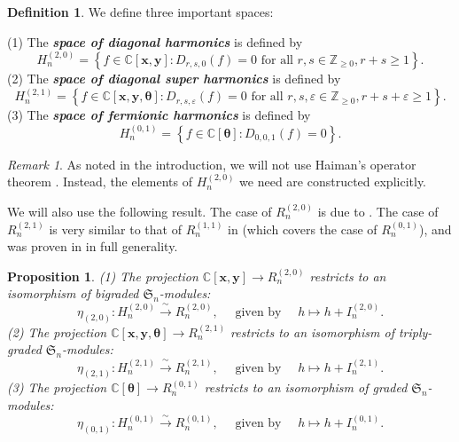 \documentclass[11pt, noadjust, reqno]{amsart}
\newtheorem{proposition}[theorem]{Proposition}
\theoremstyle{definition}
\newtheorem{definition}[theorem]{Definition}
\theoremstyle{remark}
\newtheorem{remark}[theorem]{Remark}
\numberwithin{equation}{section}
\newcommand{\0}{\emptyset}
\newcommand{\C}{\mathbb{C}}
\newcommand{\newword}[1]{\emph{\textbf{#1}}}
\begin{document}
\begin{definition} We define three important spaces:

\noindent
(1) The \newword{space of diagonal harmonics} is defined by
\begin{equation}\label{eq:diag-coinv}
    H_n^{(2,0)} = \left\{ f \in \C[\bm{x}, \bm{y}]  : D_{r,s,0}(f) = 0 \text{ for all } r,s \in \mathbb{Z}_{\geq 0}, r+s \geq 1 \right\}.
\end{equation}
(2) The \newword{space of diagonal super harmonics} is defined by
\begin{equation}\label{eq:diag-super-coinv}
    H_n^{(2,1)} = \left\{ f \in \C[\bm{x}, \bm{y}, \bm{\theta}]  : D_{r,s,\varepsilon}(f) = 0 \text{ for all } r,s,\varepsilon \in \mathbb{Z}_{\geq 0}, r+s+\varepsilon \geq 1 \right\}.
\end{equation}
(3) The \newword{space of fermionic harmonics} is defined by
\begin{equation*}
    H_n^{(0,1)} = \left\{ f \in \C[\bm{\theta}]  : D_{0,0,1}(f) = 0\right\}.
\end{equation*}
\end{definition}


\begin{remark}
As noted in the introduction, we will not use Haiman's operator theorem \cite{Haiman1994,Haiman2002}. 
Instead, the elements of $H_n^{(2,0)}$ we need are constructed explicitly.
\end{remark}

We will also use the following result. 
The case of $R_n^{(2,0)}$ is due to \cite{Haiman1994}. 
The case of $R_n^{(2,1)}$ is very similar to that of $R_n^{(1,1)}$ in \cite{SwansonWallach1} (which covers the case of $R_n^{(0,1)}$), and was proven in \cite[Theorem A.4]{JiangLentfer} in full generality.

\begin{proposition}\label{prop:H-R-isomorphism}
\noindent
(1) The projection $\C[\bm{x},\bm{y}] \to R_n^{(2,0)}$ restricts to an isomorphism of bigraded $\mathfrak{S}_n$-modules:
    \begin{equation*}
    \eta_{(2,0)}:H_n^{(2,0)} \xrightarrow{\ \sim\ } R_n^{(2,0)}, \quad \text{ given by } \quad h \mapsto h + I_n^{(2,0)}.
\end{equation*}
(2) The projection $\C[\bm{x},\bm{y},\bm{\theta}] \to R_n^{(2,1)}$ restricts to an isomorphism of triply-graded $\mathfrak{S}_n$-modules:
    \begin{equation*}
   \eta_{(2,1)}: H_n^{(2,1)} \xrightarrow{\ \sim\ } R_n^{(2,1)}, \quad \text{ given by } \quad h \mapsto h + I_n^{(2,1)}.
\end{equation*}
(3) The projection $\C[\bm{\theta}] \to R_n^{(0,1)}$ restricts to an isomorphism of graded $\mathfrak{S}_n$-modules:
    \begin{equation*}
   \eta_{(0,1)}: H_n^{(0,1)} \xrightarrow{\ \sim\ } R_n^{(0,1)}, \quad \text{ given by } \quad h \mapsto h + I_n^{(0,1)}.
\end{equation*}
\end{proposition}
\end{document}
